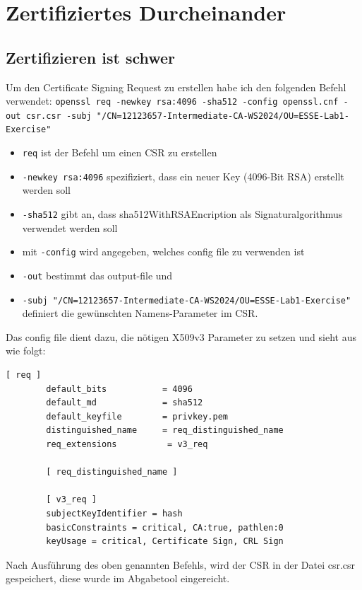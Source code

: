 \documentclass[12pt, a4paper, titlepage, oneside]{scrartcl}
\begin{document}
	\section{Zertifiziertes Durcheinander}

	\subsection{Zertifizieren ist schwer}
	Um den Certificate Signing Request zu erstellen habe ich den folgenden Befehl
	verwendet: \lstinline{openssl req -newkey rsa:4096 -sha512 -config openssl.cnf -out csr.csr -subj "/CN=12123657-Intermediate-CA-WS2024/OU=ESSE-Lab1-Exercise"}
	\begin{itemize}
		\item \lstinline{req} ist der Befehl um einen CSR zu erstellen

		\item \lstinline{-newkey rsa:4096} spezifiziert, dass ein neuer Key (4096-Bit
			RSA) erstellt werden soll

		\item \lstinline{-sha512} gibt an, dass sha512WithRSAEncription als Signaturalgorithmus
			verwendet werden soll

		\item mit \lstinline{-config} wird angegeben, welches config file zu verwenden
			ist

		\item \lstinline{-out} bestimmt das output-file und

		\item \lstinline{-subj "/CN=12123657-Intermediate-CA-WS2024/OU=ESSE-Lab1-Exercise"}
			definiert die gewünschten Namens-Parameter im CSR.
	\end{itemize}
	Das config file dient dazu, die nötigen X509v3 Parameter zu setzen und sieht aus
	wie folgt:
	\begin{lstlisting}[caption=openssl.cnf,label=code:opensslConfig,style=simple]
		[ req ]
		default_bits           = 4096
		default_md             = sha512
		default_keyfile        = privkey.pem
		distinguished_name     = req_distinguished_name
		req_extensions          = v3_req

		[ req_distinguished_name ]

		[ v3_req ]
		subjectKeyIdentifier = hash
		basicConstraints = critical, CA:true, pathlen:0
		keyUsage = critical, Certificate Sign, CRL Sign
	\end{lstlisting}
	Nach Ausführung des oben genannten Befehls, wird der CSR in der Datei csr.csr gespeichert,
	diese wurde im Abgabetool eingereicht.
\end{document}
